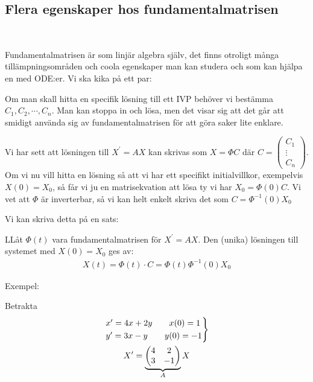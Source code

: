 \subsection{Flera egenskaper hos fundamentalmatrisen}\hfill\\
\par\bigskip
\noindent Fundamentalmatrisen är som linjär algebra själv, det finns otroligt många tillämpningsområden och coola egenskaper man kan studera och som kan hjälpa en med ODE:er. Vi ska kika på ett par:
\par\bigskip

\noindent Om man skall hitta en specifik lösning till ett IVP behöver vi bestämma $C_1, C_2,\cdots, C_n$. Man kan stoppa in och lösa, men det visar sig att det går att smidigt använda sig av fundamentalmatrisen för att göra saker lite enklare.\par
\noindent Vi har sett att lösningen till $X^{\prime} = AX$ kan skrivas som $X = \Phi C$ där $C = \begin{pmatrix}C_1\\\vdots\\C_n\end{pmatrix}$. Om vi nu vill hitta en lösning så att vi har ett specifikt initialvillkor, exempelvis $X(0)=X_0$, så får vi ju en matrisekvation att lösa ty vi har $X_0 = \Phi(0)C$. Vi vet att $\Phi$ är inverterbar, så vi kan helt enkelt skriva det som $C = \Phi^{-1}(0)X_0$\par
\noindent Vi kan skriva detta på en sats:
\par\bigskip
\begin{theo}
  LLåt $\Phi(t)$ vara fundamentalmatrisen för $X^{\prime} = AX$. Den (unika) lösningen till systemet med $X(0)=X_0$ ges av:
  \begin{equation*}
    \begin{gathered}
      X(t)=\Phi(t)\cdot C = \Phi(t)\Phi^{-1}(0)X_0
    \end{gathered}
  \end{equation*}
\end{theo}
\par\bigskip
\noindent Exempel:\par
\noindent Betrakta
\begin{equation*}
  \begin{gathered}
    \begin{rcases*}
      x^{\prime} = 4x+2y\qquad x(0)=1\\
      y^{\prime} = 3x-y\qquad y(0)=-1
    \end{rcases*}\\
    X^{\prime} = \underbrace{\begin{pmatrix}4&2\\3&-1\end{pmatrix}}_{\text{$A$}}X
  \end{gathered}
\end{equation*}\par
